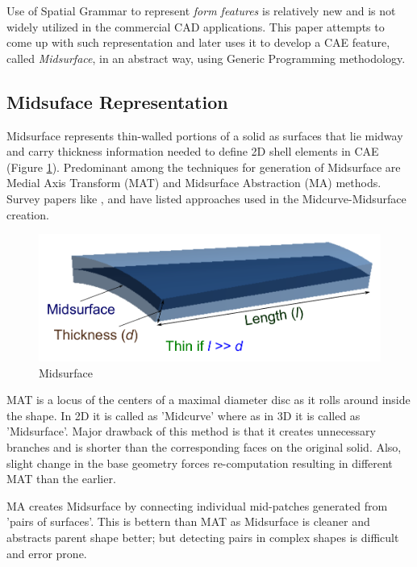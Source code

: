 Use of Spatial Grammar to represent {\em form features} is relatively new and is not widely utilized in the commercial CAD applications. This paper attempts to come up with such representation and later uses it to develop a CAE feature, called {\em Midsurface}, in an abstract way, using Generic Programming methodology.


\subsection{Midsuface Representation}

Midsurface represents thin-walled portions of a solid as surfaces that lie midway and carry thickness information needed to define 2D shell elements in CAE (Figure \ref{figure_Midsurf}). Predominant among the techniques for generation of Midsurface are Medial Axis Transform (MAT) and Midsurface Abstraction (MA) methods. Survey papers like \cite{Lam1992}, \cite{Yogesh2010} and \cite{Attali2004}  have listed approaches used in the Midcurve-Midsurface creation.

	\begin{figure}[h]
	\includegraphics[scale=0.4]{../Common/images//Midsurf.pdf}
	\caption{Midsurface}
	\label{figure_Midsurf}
	\end{figure}

MAT is a locus of the centers of a maximal diameter disc as it rolls around inside the shape. In 2D it is called as 'Midcurve' where as in 3D it is called as 'Midsurface'. Major drawback of this method is that it creates unnecessary branches and is shorter than the corresponding faces on the original solid. Also, slight change in the base geometry forces re-computation resulting in different MAT than the earlier. 

MA creates Midsurface by connecting individual mid-patches generated from 'pairs of surfaces'. This is bettern than MAT as Midsurface is cleaner and abstracts parent shape better; but detecting pairs in complex shapes is difficult and error prone. 

